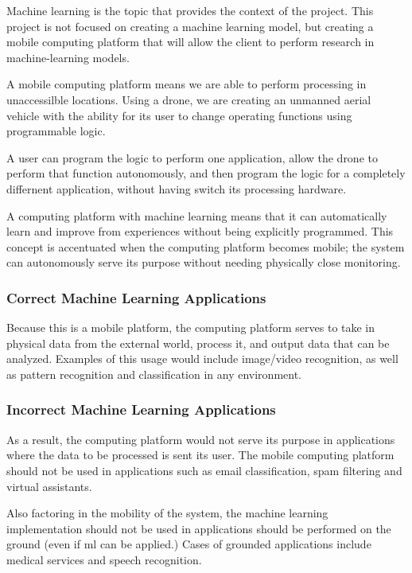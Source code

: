 
% 


Machine learning is the topic that provides the context of the project. This project is not focused on creating a machine learning model, but creating a mobile computing platform that will allow the client to perform research in machine-learning models.

A mobile computing platform means we are able to perform processing in unaccessilble locations. Using a drone, we are creating an unmanned aerial vehicle with the ability for its user to change operating functions using programmable logic.

A user can program the logic to perform one application, allow the drone to perform that function autonomously, and then program the logic for a completely differnent application, without having switch its processing hardware.

A computing platform with machine learning means that it can automatically learn and improve from experiences without being explicitly programmed. This concept is accentuated when the computing platform becomes mobile; the system can autonomously serve its purpose without needing physically close monitoring.

\subsubsection{Correct Machine Learning Applications}
Because this is a mobile platform, the computing platform serves to take in physical data from the external world, process it, and output data that can be analyzed. Examples of this usage would include image/video recognition, as well as pattern recognition and classification in any environment.

\subsubsection{Incorrect Machine Learning Applications}
As a result, the computing platform would not serve its purpose in applications where the data to be processed is sent its user. The mobile computing platform should not be used in applications such as email classification, spam filtering and virtual assistants.

Also factoring in the mobility of the system, the machine learning implementation should not be used in applications should be performed on the ground (even if ml can be applied.) Cases of grounded applications include medical services and speech recognition.

